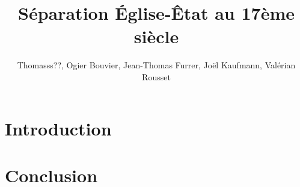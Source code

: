 \documentclass{article}
\title{S\'eparation \'Eglise-\^Etat au 17\`eme si\`ecle}
\author{Thomasss??, Ogier Bouvier, Jean-Thomas Furrer, Jo\"el Kaufmann, Val\'erian Rousset}
\begin{document}
\maketitle

\section{Introduction}

\section{Conclusion}
\end{document}
